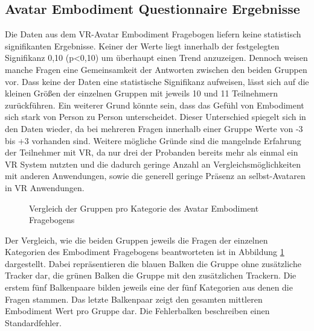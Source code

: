 \subsection{Avatar Embodiment Questionnaire Ergebnisse}
Die Daten aus dem VR-Avatar Embodiment Fragebogen liefern keine statistisch signifikanten Ergebnisse. Keiner der Werte liegt innerhalb der festgelegten Signifikanz 0,10 (p<0,10) um überhaupt einen Trend anzuzeigen. Dennoch weisen manche Fragen eine Gemeinsamkeit der Antworten zwischen den beiden Gruppen vor. Dass keine der Daten eine statistische Signifikanz aufweisen, lässt sich auf die kleinen Größen der einzelnen Gruppen mit jeweils 10 und 11 Teilnehmern zurückführen. Ein weiterer Grund könnte sein, dass das Gefühl von Embodiment sich stark von Person zu Person unterscheidet. Dieser Unterschied spiegelt sich in den Daten wieder, da bei mehreren Fragen innerhalb einer Gruppe Werte von -3 bis +3 vorhanden sind.
Weitere mögliche Gründe sind die mangelnde Erfahrung der Teilnehmer mit VR, da nur drei der Probanden bereits mehr als einmal ein VR System nutzten und die dadurch geringe Anzahl an Vergleichsmöglichkeiten mit anderen Anwendungen, sowie die generell geringe Präsenz an selbst-Avataren in VR Anwendungen.

\begin{figure}[h]
  \caption[Avatar Embodiment Durchschnitte pro Kategorie]{Vergleich der Gruppen pro Kategorie des Avatar Embodiment Fragebogens}
  \label{fig:TotalEmbodiment-Kategorien}
\end{figure}

Der Vergleich, wie die beiden Gruppen jeweils die Fragen der einzelnen Kategorien des Embodiment Fragebogens beantworteten ist in Abbildung \ref{fig:TotalEmbodiment-Kategorien} dargestellt. Dabei repräsentieren die blauen Balken die Gruppe ohne zusätzliche Tracker dar, die grünen Balken die Gruppe mit den zusätzlichen Trackern. Die erstem fünf Balkenpaare bilden jeweils eine der fünf Kategorien aus denen die Fragen stammen. Das letzte Balkenpaar zeigt den gesamten mittleren Embodiment Wert pro Gruppe dar. Die Fehlerbalken beschreiben einen Standardfehler.


